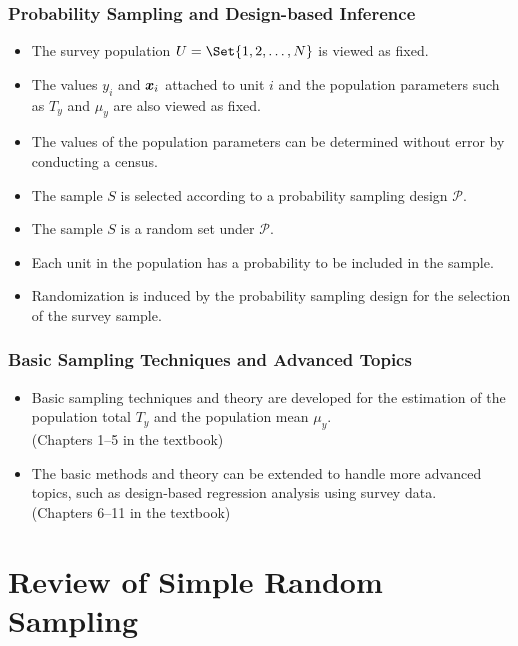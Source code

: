 \subsection*{Probability Sampling and Design-based Inference}
\begin{Regular}{}
    \begin{itemize}
        \item The survey population $ U=\Set{1,2,\ldots,N} $ is viewed as fixed.
        \item The values $ y_i $ and $ \bm{x}_i $ attached to unit $ i $
              and the population parameters such as $ T_y $ and $ \mu_y $
              are also viewed as fixed.
        \item The values of the population parameters can be determined without error by conducting
              a census.
        \item The sample $ S $ is selected according to a probability sampling design $ \mathcal{P} $.
        \item The sample $ S $ is a random set under $ \mathcal{P} $.
        \item Each unit in the population has a probability to be included in the
              sample.
        \item Randomization is induced by the probability sampling design for
              the selection of the survey sample.
    \end{itemize}
\end{Regular}
\subsection*{Basic Sampling Techniques and Advanced Topics}
\begin{itemize}
    \item Basic sampling techniques and theory are developed for the
          estimation of the population total $T_y$ and the population mean $ \mu_y $.\\
          (Chapters 1--5 in the textbook)
    \item The basic methods and theory can be extended to handle more
          advanced topics, such as design-based regression analysis using
          survey data.\\
          (Chapters 6--11 in the textbook)
\end{itemize}
\chapter{Review of Simple Random Sampling}
